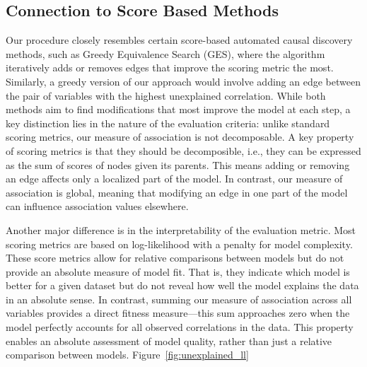 \documentclass{uai2025} %
\begin{document}
% 	
% 	
% 

\subsection{Connection to Score Based Methods}

Our procedure closely resembles certain score-based automated causal discovery
methods, such as Greedy Equivalence Search (GES), where the algorithm
iteratively adds or removes edges that improve the scoring metric the most.
Similarly, a greedy version of our approach would involve adding an edge
between the pair of variables with the highest unexplained correlation. While
both methods aim to find modifications that most improve the model at each
step, a key distinction lies in the nature of the evaluation criteria: unlike
standard scoring metrics, our measure of association is not decomposable. A key
property of scoring metrics is that they should be decomposible, i.e., they can
be expressed as the sum of scores of nodes given its parents. This means adding
or removing an edge affects only a localized part of the model. In contrast,
our measure of association is global, meaning that modifying an edge in one
part of the model can influence association values elsewhere.

Another major difference is in the interpretability of the evaluation metric.
Most scoring metrics are based on log-likelihood with a penalty for model
complexity. These score metrics allow for relative comparisons between models
but do not provide an absolute measure of model fit. That is, they indicate
which model is better for a given dataset but do not reveal how well the model
explains the data in an absolute sense. In contrast, summing our measure of
association across all variables provides a direct fitness measure—this sum
approaches zero when the model perfectly accounts for all observed correlations
in the data. This property enables an absolute assessment of model quality,
rather than just a relative comparison between models. Figure~\ref{fig:unexplained_ll}
\end{document}
